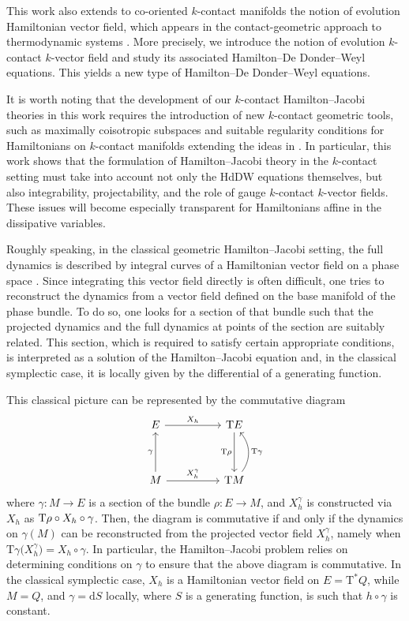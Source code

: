 \documentclass[11pt,twoside]{article}
\theoremstyle{plain}
\theoremstyle{definition}
\theoremstyle{remark}
\renewcommand{\d}{\mathrm{d}}
\newcommand{\T}{\mathrm{T}}
\begin{document}
This work also extends to co-oriented $k$-contact manifolds the notion of evolution Hamiltonian vector field, which appears in the contact-geometric approach to thermodynamic systems \cite{LL_19}. More precisely, we introduce the notion of evolution $k$-contact $k$-vector field and study its associated Hamilton--De Donder--Weyl equations. This yields a new type of Hamilton--De Donder--Weyl equations.

It is worth noting that the development of our $k$-contact Hamilton--Jacobi theories in this work requires the introduction of new $k$-contact geometric tools, such as maximally coisotropic subspaces and suitable regularity conditions for Hamiltonians on $k$-contact manifolds extending the ideas in \cite{GGMRR_21,LLM_21a}. In particular, this work shows that the formulation of Hamilton--Jacobi theory in the $k$-contact setting must take into account not only the HdDW equations themselves, but also integrability, projectability, and the role of gauge $k$-contact $k$-vector fields. These issues will become especially transparent for Hamiltonians affine in the dissipative variables. 

Roughly speaking, in the classical geometric Hamilton--Jacobi setting, the full dynamics is described by integral curves of a Hamiltonian vector field on a phase space \cite{AM_78}. Since integrating this vector field directly is often difficult, one tries to reconstruct the dynamics from a vector field defined on the base manifold of the phase bundle. To do so, one looks for a section of that bundle such that the projected dynamics and the full dynamics at points of the section are suitably related. This section, which is required to satisfy certain appropriate conditions, is interpreted as a solution of the Hamilton--Jacobi equation and, in the classical symplectic case, it is locally given by the differential of a generating function.

This classical picture can be represented by the commutative diagram
\begin{equation}\label{diagramintro}
\begin{tikzcd}[row sep=huge, column sep=huge]
E  \arrow[r, "X_h"] & \T E \arrow[d, swap, "\T \rho"] \\
M \arrow[r, "X_h^\gamma"] \arrow[u,  "\gamma"] & \T M \arrow[u, bend right=40, swap, "\T \gamma"]
\end{tikzcd}
\end{equation}
where $\gamma\colon M\to E$ is a section of the bundle $\rho\colon E\to M$, and $X^\gamma_h$ is constructed via $X_h$ as ${\rm T\rho}\circ X_h\circ \gamma$. Then, the diagram is commutative if and only if the dynamics on $\gamma(M)$ can be reconstructed from the projected vector field $X_h^\gamma$, namely when
\(
\T\gamma\bigl(X^\gamma_h\bigr)=X_h\circ \gamma.
\) In particular, the Hamilton--Jacobi problem relies on determining conditions on $\gamma$ to ensure that the above diagram is commutative.
In the classical symplectic case, $X_h$ is a Hamiltonian vector field on $E=\T^*Q$, while $M=Q$, and $\gamma = \d S$ locally, where $S$ is a generating function, is such that $h \circ \gamma$ is constant.
\end{document}
